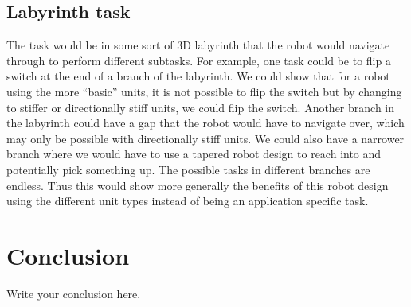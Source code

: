 \documentclass[12pt]{article}
\begin{document}
\subsection{Labyrinth task}
The task would be in some sort of 3D labyrinth that the robot would navigate through to perform different subtasks. 
For example, one task could be to flip a switch at the end of a branch of the labyrinth. 
We could show that for a robot using the more “basic” units, it is not possible to flip the switch but by changing to stiffer or directionally stiff units, we could flip the switch. Another branch in the labyrinth could have a gap that the robot would have to navigate over, which may only be possible with directionally stiff units. 
We could also have a narrower branch where we would have to use a tapered robot design to reach into and potentially pick something up. 
The possible tasks in different branches are endless. 
Thus this would show more generally the benefits of this robot design using the different unit types instead of being an application specific task.


\section{Conclusion}
Write your conclusion here.
\end{document}
